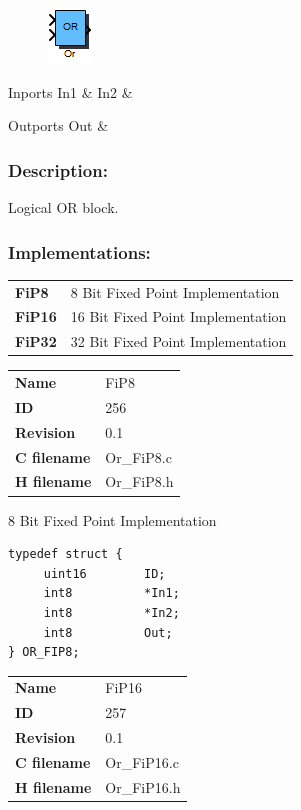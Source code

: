 \label{block:Or}
\begin{figure}[H]\includegraphics{Or}\end{figure} 

\begin{XtoCtabular}{Inports}
In1 & \tabularnewline
\hline
In2 & \tabularnewline
\hline
\end{XtoCtabular}


\begin{XtoCtabular}{Outports}
Out & \tabularnewline
\hline
\end{XtoCtabular}

\subsubsection*{Description:}
Logical OR block.

\subsubsection*{Implementations:}
\begin{tabular}{l l}
\textbf{FiP8} & 8 Bit Fixed Point Implementation\tabularnewline
\textbf{FiP16} & 16 Bit Fixed Point Implementation\tabularnewline
\textbf{FiP32} & 32 Bit Fixed Point Implementation\tabularnewline
\end{tabular}

\nopagebreak[0]
\begin{tabular}{l l}
\textbf{Name} & FiP8 \tabularnewline
\textbf{ID} & 256 \tabularnewline
\textbf{Revision} & 0.1 \tabularnewline
\textbf{C filename} & Or\_FiP8.c \tabularnewline
\textbf{H filename} & Or\_FiP8.h \tabularnewline
\end{tabular}
\vspace{1ex}

8 Bit Fixed Point Implementation

\begin{lstlisting}
typedef struct {
     uint16        ID;
     int8          *In1;
     int8          *In2;
     int8          Out;
} OR_FIP8;
\end{lstlisting}

\ifdefined \AddTestReports
{}
\fi
{}
\nopagebreak[0]
\begin{tabular}{l l}
\textbf{Name} & FiP16 \tabularnewline
\textbf{ID} & 257 \tabularnewline
\textbf{Revision} & 0.1 \tabularnewline
\textbf{C filename} & Or\_FiP16.c \tabularnewline
\textbf{H filename} & Or\_FiP16.h \tabularnewline
\end{tabular}
\vspace{1ex}

